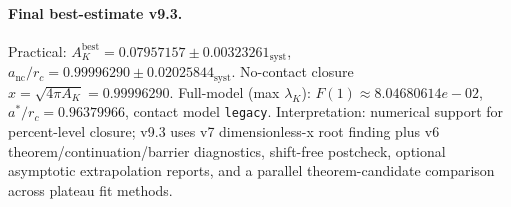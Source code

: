 \paragraph{Final best-estimate v9.3.}
Practical: $A_K^{\mathrm{best}} = 0.07957157 \pm 0.00323261_{\mathrm{syst}}$, $a_{\mathrm{nc}}/r_c = 0.99996290 \pm 0.02025844_{\mathrm{syst}}$.
No-contact closure $x = \sqrt{4\pi A_K} = 0.99996290$.
Full-model (max $\lambda_K$): $F(1) \approx 8.04680614e-02$, $a^*/r_c = 0.96379966$, contact model \texttt{legacy}.
Interpretation: numerical support for percent-level closure; v9.3 uses v7 dimensionless-x root finding plus v6 theorem/continuation/barrier diagnostics, shift-free postcheck, optional asymptotic extrapolation reports, and a parallel theorem-candidate comparison across plateau fit methods.

